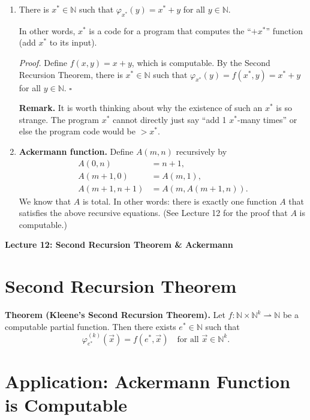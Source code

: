 \documentclass[11pt]{article}
\begin{document}
\begin{enumerate}[leftmargin=1.8em, label=\arabic*)]
    \item There is $x^* \in \mathbb{N}$ such that $\varphi_{x^*}(y) = x^* + y$ for all $y \in \mathbb{N}$.

    In other words, $x^*$ is a code for a program that computes the ``$+x^*$'' function (add $x^*$ to its input).

    \textit{Proof.} Define $f(x,y) = x + y$, which is computable. By the Second Recursion Theorem, there is $x^* \in \mathbb{N}$ such that $\varphi_{x^*}(y) = f(x^*, y) = x^* + y$ for all $y \in \mathbb{N}$. \hfill$\square$

    \textbf{Remark.} It is worth thinking about why the existence of such an $x^*$ is so strange. The program $x^*$ cannot directly just say ``add 1 $x^*$-many times'' or else the program code would be $> x^*$.

    \item \textbf{Ackermann function.} Define $A(m,n)$ recursively by
    \begin{align*}
        A(0, n) &= n + 1, \\
        A(m+1, 0) &= A(m, 1), \\
        A(m+1, n+1) &= A(m, A(m+1, n)).
    \end{align*}
    We know that $A$ is total. In other words: there is exactly one function $A$ that satisfies the above recursive equations. (See Lecture 12 for the proof that $A$ is computable.)
\end{enumerate}

\newpage
{\LARGE\bfseries Lecture 12: Second Recursion Theorem \& Ackermann}

\section{Second Recursion Theorem}

\textbf{Theorem (Kleene's Second Recursion Theorem).} Let $f\colon \mathbb{N} \times \mathbb{N}^k \rightharpoonup \mathbb{N}$ be a computable partial function. Then there exists $e^* \in \mathbb{N}$ such that
\[
    \varphi_{e^*}^{(k)}(\vec{x}) = f(e^*, \vec{x}) \quad \text{for all } \vec{x} \in \mathbb{N}^k.
\]

\section{Application: Ackermann Function is Computable}
\end{document}
